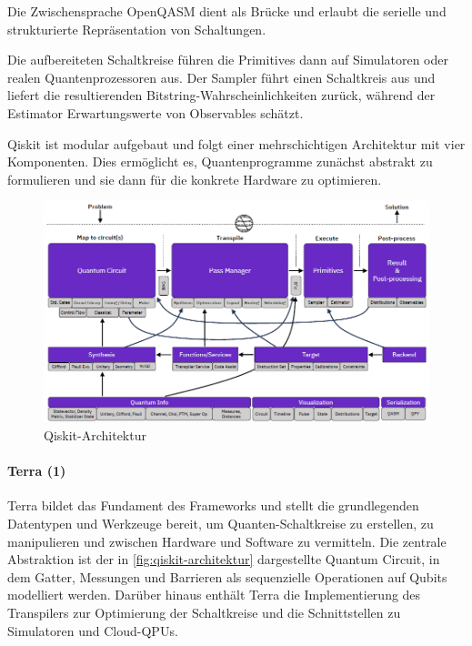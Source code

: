 Die Zwischensprache OpenQASM dient als Brücke und erlaubt die serielle und strukturierte Repräsentation von Schaltungen. \autocite{crossOpenQuantumAssembly2017a}

Die aufbereiteten Schaltkreise führen die Primitives dann auf Simulatoren oder realen Quantenprozessoren aus. Der Sampler führt einen Schaltkreis aus und liefert die resultierenden Bitstring-Wahrscheinlichkeiten zurück, während der Estimator Erwartungswerte von Observables schätzt.

Qiskit ist modular aufgebaut und folgt einer mehrschichtigen Architektur mit vier Komponenten. Dies ermöglicht es, Quantenprogramme zunächst abstrakt zu formulieren und sie dann für die konkrete Hardware zu optimieren. \autocite{javadi-abhariQuantumComputingQiskit2024a}

\begin{figure}[ht!]
    \centering
    \includegraphics[width=1\linewidth]{images/languages/Qiskit-Architektur.png}
    \caption{Qiskit-Architektur \autocite{javadi-abhariQuantumComputingQiskit2024a}}
    \label{fig:qiskit-architektur}
\end{figure}

\paragraph{Terra (1)} Terra bildet das Fundament des Frameworks und stellt die grundlegenden Datentypen und Werkzeuge bereit, um Quanten-Schaltkreise zu erstellen, zu manipulieren und zwischen Hardware und Software zu vermitteln. Die zentrale Abstraktion ist der in \autoref{fig:qiskit-architektur} dargestellte Quantum Circuit, in dem Gatter, Messungen und Barrieren als sequenzielle Operationen auf Qubits modelliert werden. Darüber hinaus enthält Terra die Implementierung des Transpilers zur Optimierung der Schaltkreise und die Schnittstellen zu Simulatoren und Cloud-QPUs. \autocite{javadi-abhariQuantumComputingQiskit2024a}

